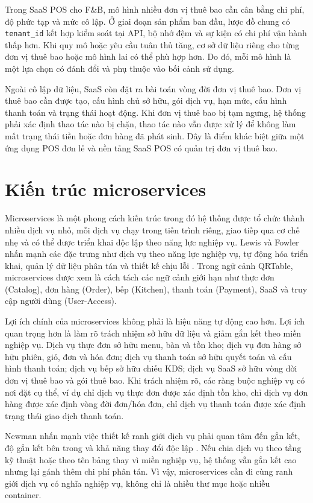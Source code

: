 Trong SaaS POS cho F\&B, mô hình nhiều đơn vị thuê bao cần cân bằng chi phí, độ phức tạp và mức cô lập. Ở giai đoạn sản phẩm ban đầu, lược đồ chung có \texttt{tenant\_id} kết hợp kiểm soát tại API, bộ nhớ đệm và sự kiện có chi phí vận hành thấp hơn. Khi quy mô hoặc yêu cầu tuân thủ tăng, cơ sở dữ liệu riêng cho từng đơn vị thuê bao hoặc mô hình lai có thể phù hợp hơn. Do đó, mỗi mô hình là một lựa chọn có đánh đổi và phụ thuộc vào bối cảnh sử dụng.

Ngoài cô lập dữ liệu, SaaS còn đặt ra bài toán vòng đời đơn vị thuê bao. Đơn vị thuê bao cần được tạo, cấu hình chủ sở hữu, gói dịch vụ, hạn mức, cấu hình thanh toán và trạng thái hoạt động. Khi đơn vị thuê bao bị tạm ngưng, hệ thống phải xác định thao tác nào bị chặn, thao tác nào vẫn được xử lý để không làm mất trạng thái tiền hoặc đơn hàng đã phát sinh. Đây là điểm khác biệt giữa một ứng dụng POS đơn lẻ và nền tảng SaaS POS có quản trị đơn vị thuê bao.

\section{Kiến trúc microservices}

Microservices là một phong cách kiến trúc trong đó hệ thống được tổ chức thành nhiều dịch vụ nhỏ, mỗi dịch vụ chạy trong tiến trình riêng, giao tiếp qua cơ chế nhẹ và có thể được triển khai độc lập theo năng lực nghiệp vụ. Lewis và Fowler nhấn mạnh các đặc trưng như dịch vụ theo năng lực nghiệp vụ, tự động hóa triển khai, quản lý dữ liệu phân tán và thiết kế chịu lỗi \cite{lewis-fowler-microservices-2014}. Trong ngữ cảnh QRTable, microservices được xem là cách tách các ngữ cảnh giới hạn như thực đơn (Catalog), đơn hàng (Order), bếp (Kitchen), thanh toán (Payment), SaaS và truy cập người dùng (User-Access).

Lợi ích chính của microservices không phải là hiệu năng tự động cao hơn. Lợi ích quan trọng hơn là làm rõ trách nhiệm sở hữu dữ liệu và giảm gắn kết theo miền nghiệp vụ. Dịch vụ thực đơn sở hữu menu, bàn và tồn kho; dịch vụ đơn hàng sở hữu phiên, giỏ, đơn và hóa đơn; dịch vụ thanh toán sở hữu quyết toán và cấu hình thanh toán; dịch vụ bếp sở hữu chiếu KDS; dịch vụ SaaS sở hữu vòng đời đơn vị thuê bao và gói thuê bao. Khi trách nhiệm rõ, các ràng buộc nghiệp vụ có nơi đặt cụ thể, ví dụ chỉ dịch vụ thực đơn được xác định tồn kho, chỉ dịch vụ đơn hàng được xác định vòng đời đơn/hóa đơn, chỉ dịch vụ thanh toán được xác định trạng thái giao dịch thanh toán.

Newman nhấn mạnh việc thiết kế ranh giới dịch vụ phải quan tâm đến gắn kết, độ gắn kết bên trong và khả năng thay đổi độc lập \cite{newman-building-microservices-2021}. Nếu chia dịch vụ theo tầng kỹ thuật hoặc theo tên bảng thay vì miền nghiệp vụ, hệ thống vẫn gắn kết cao nhưng lại gánh thêm chi phí phân tán. Vì vậy, microservices cần đi cùng ranh giới dịch vụ có nghĩa nghiệp vụ, không chỉ là nhiều thư mục hoặc nhiều container.

